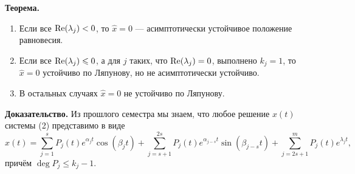 \textbf{Теорема.} 
\begin{enumerate}
    \item Если все $\operatorname{Re}(\lambda_j) < 0$, то $\widehat{x} = 0$ --- асимптотически устойчивое положение равновесия.
    \item Если все $\operatorname{Re}(\lambda_j) \leqslant 0$, а для $j$ таких, что $\operatorname{Re}(\lambda_j) = 0$, выполнено $k_j = 1$, то $\widehat{x} = 0$ устойчиво по Ляпунову, но не асимптотически устойчиво.
    \item В остальных случаях $\widehat{x} = 0$ не устойчиво по Ляпунову.
\end{enumerate}

\textbf{Доказательство.} Из прошлого семестра мы знаем, что любое решение $x(t)$ системы (2) представимо в виде
\[
    x(t) = \sum_{j=1}^{s} P_j(t) e^{\alpha_j t}\cos(\beta_j t) + \sum_{j=s+1}^{2s} P_j(t) e^{\alpha_{j-s} t}\sin(\beta_{j-s} t) + \sum_{j=2s+1}^{m} P_j(t) e^{\lambda_j t},
\]
причём $\deg P_j \le k_j - 1$.

